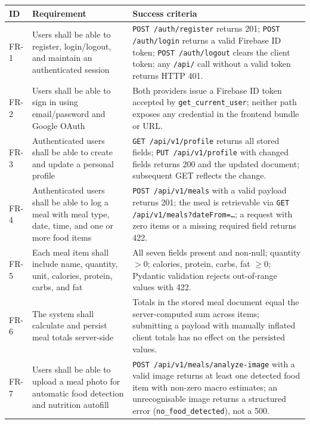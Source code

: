 \documentclass[11pt]{article}
\begin{document}
\begin{longtable}{p{1.2cm} p{5.8cm} p{6.5cm}}
  \toprule
  \textbf{ID} & \textbf{Requirement} & \textbf{Success criteria} \\
  \midrule
  \endhead

  FR-1  & Users shall be able to register, login/logout, and maintain an authenticated session
        & \texttt{POST /auth/register} returns 201; \texttt{POST /auth/login} returns a valid
          Firebase ID token; \texttt{POST /auth/logout} clears the client token; any
          \texttt{/api/} call without a valid token returns HTTP 401. \\[2pt]

  FR-2  & Users shall be able to sign in using email/password and Google OAuth
        & Both providers issue a Firebase ID token accepted by \texttt{get\_current\_user};
          neither path exposes any credential in the frontend bundle or URL. \\[2pt]

  FR-3  & Authenticated users shall be able to create and update a personal profile
        & \texttt{GET /api/v1/profile} returns all stored fields; \texttt{PUT /api/v1/profile}
          with changed fields returns 200 and the updated document; subsequent GET reflects
          the change. \\[2pt]

  FR-4  & Authenticated users shall be able to log a meal with meal type, date, time, and
          one or more food items
        & \texttt{POST /api/v1/meals} with a valid payload returns 201; the meal is
          retrievable via \texttt{GET /api/v1/meals?dateFrom=\ldots}; a request with
          zero items or a missing required field returns 422. \\[2pt]

  FR-5  & Each meal item shall include name, quantity, unit, calories, protein, carbs, and fat
        & All seven fields present and non-null; quantity $> 0$; calories, protein, carbs,
          fat $\geq 0$; Pydantic validation rejects out-of-range values with 422. \\[2pt]

  FR-6  & The system shall calculate and persist meal totals server-side
        & Totals in the stored meal document equal the server-computed sum across items;
          submitting a payload with manually inflated client totals has no effect on
          the persisted values. \\[2pt]

  FR-7  & Users shall be able to upload a meal photo for automatic food detection
          and nutrition autofill
        & \texttt{POST /api/v1/meals/analyze-image} with a valid image returns at least one
          detected food item with non-zero macro estimates; an unrecognisable image returns
          a structured error (\texttt{no\_food\_detected}), not a 500. \\[2pt]


\end{longtable}
\end{document}
